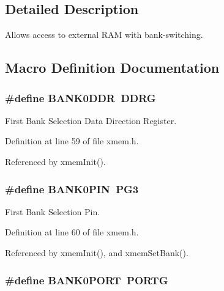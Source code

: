 \subsection{Detailed Description}
Allows access to external R\-A\-M with bank-\/switching. 

\subsection{Macro Definition Documentation}
\hypertarget{group__xmem_gafba0bbf9336cfc754622a5e9b3d12d80}{
\subsubsection[{B\-A\-N\-K0\-D\-D\-R}]{\setlength{\rightskip}{0pt plus 5cm}\#define B\-A\-N\-K0\-D\-D\-R~D\-D\-R\-G}}\label{group__xmem_gafba0bbf9336cfc754622a5e9b3d12d80}


First Bank Selection Data Direction Register. 



Definition at line 59 of file xmem.\-h.



Referenced by xmem\-Init().

\hypertarget{group__xmem_gaa176e9b2752f764cd7e7d9fd49d46af8}{
\subsubsection[{B\-A\-N\-K0\-P\-I\-N}]{\setlength{\rightskip}{0pt plus 5cm}\#define B\-A\-N\-K0\-P\-I\-N~P\-G3}}\label{group__xmem_gaa176e9b2752f764cd7e7d9fd49d46af8}


First Bank Selection Pin. 



Definition at line 60 of file xmem.\-h.



Referenced by xmem\-Init(), and xmem\-Set\-Bank().

\hypertarget{group__xmem_gabeec1986c81588dde8863b7936028fc9}{
\subsubsection[{B\-A\-N\-K0\-P\-O\-R\-T}]{\setlength{\rightskip}{0pt plus 5cm}\#define B\-A\-N\-K0\-P\-O\-R\-T~P\-O\-R\-T\-G}}\label{group__xmem_gabeec1986c81588dde8863b7936028fc9}


